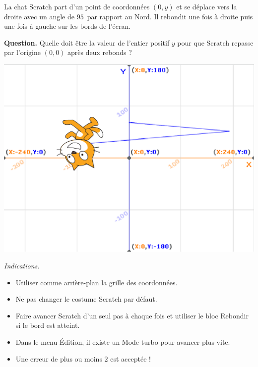 \documentclass[class=report,crop=false, 12pt]{standalone}
\begin{document}
\begin{enigme}

La chat Scratch part d'un point de coordonnées $(0,y)$ et se déplace vers la droite avec un angle de $95$\textdegree\ par rapport au Nord. Il rebondit une fois à droite puis une fois à gauche sur les bords de l'écran.


\textbf{Question.} Quelle doit être la valeur de l'entier positif $y$ pour que Scratch repasse par l'origine $(0,0)$ après deux rebonds ?

\bigskip

\begin{center}
  \includegraphics[scale=\scaleecran]{ecran-03-eg2}   
\end{center}

\bigskip

\emph{Indications.} 
\begin{itemize}
  \item Utiliser comme arrière-plan la grille des coordonnées.
  
  \item Ne pas changer le costume Scratch par défaut.
  
  \item Faire avancer Scratch d'un seul pas à chaque fois et utiliser le bloc \og{}Rebondir si le bord est atteint\fg{}.
  
  \item Dans le menu \og{}Édition\fg{}, il existe un \og{}Mode turbo\fg{} pour avancer plus vite.
  
  \item Une erreur de plus ou moins $2$ est acceptée !
\end{itemize}



\end{enigme}
\end{document}
